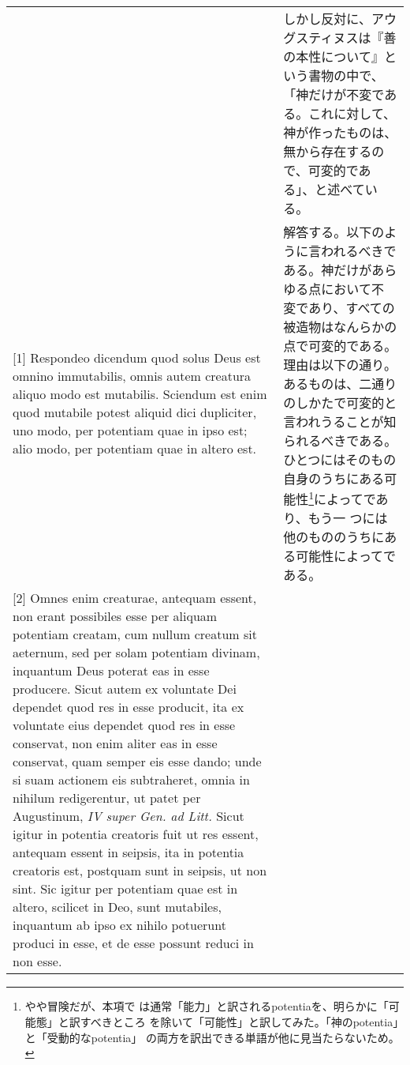 \documentclass[10pt]{jsarticle} %
\begin{document}
\begin{longtable}{p{21em}p{21em}}
&

しかし反対に、アウグスティヌスは『善の本性について』という書物の中で、
「神だけが不変である。これに対して、神が作ったものは、無から存在するの
で、可変的である」、と述べている。


\\


[1] Respondeo dicendum quod solus Deus est omnino immutabilis, omnis
 autem creatura aliquo modo est mutabilis.  Sciendum est enim quod
 mutabile potest aliquid dici dupliciter, uno modo, per potentiam quae
 in ipso est; alio modo, per potentiam quae in altero est.


&

解答する。以下のように言われるべきである。神だけがあらゆる点において不
変であり、すべての被造物はなんらかの点で可変的である。理由は以下の通り。
あるものは、二通りのしかたで可変的と言われうることが知られるべきである。
ひとつにはそのもの自身のうちにある可能性\footnote{やや冒険だが、本項で
は通常「能力」と訳されるpotentiaを、明らかに「可能態」と訳すべきところ
を除いて「可能性」と訳してみた。「神のpotentia」と「受動的なpotentia」
の両方を訳出できる単語が他に見当たらないため。}によってであり、もう一
つには他のもののうちにある可能性によってである。

\\

[2] Omnes enim creaturae, antequam essent, non erant possibiles esse
per aliquam potentiam creatam, cum nullum creatum sit aeternum, sed
per solam potentiam divinam, inquantum Deus poterat eas in esse
producere. Sicut autem ex voluntate Dei dependet quod res in esse
producit, ita ex voluntate eius dependet quod res in esse conservat,
non enim aliter eas in esse conservat, quam semper eis esse dando;
unde si suam actionem eis subtraheret, omnia in nihilum redigerentur,
ut patet per Augustinum, {\it IV super Gen. ad Litt.} Sicut igitur in
potentia creatoris fuit ut res essent, antequam essent in seipsis, ita
in potentia creatoris est, postquam sunt in seipsis, ut non sint. Sic
igitur per potentiam quae est in altero, scilicet in Deo, sunt
mutabiles, inquantum ab ipso ex nihilo potuerunt produci in esse, et
de esse possunt reduci in non esse.

&


\end{longtable}
\end{document}
